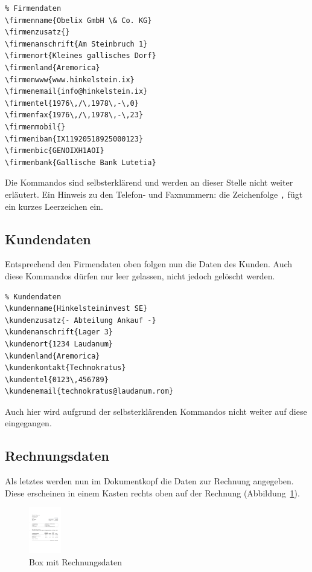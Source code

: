 \documentclass[11pt,pdftex]{scrartcl}
\newcommand{\bs}{\symbol{'134}}
\newcommand{\Cmd}[1]{\texttt{\def\{{\char`\{}\def\}{\char`\}}\bs#1}}
\begin{document}
\begin{verbatim}
% Firmendaten
\firmenname{Obelix GmbH \& Co. KG}
\firmenzusatz{}
\firmenanschrift{Am Steinbruch 1}
\firmenort{Kleines gallisches Dorf}
\firmenland{Aremorica}
\firmenwww{www.hinkelstein.ix}
\firmenemail{info@hinkelstein.ix}
\firmentel{1976\,/\,1978\,-\,0}
\firmenfax{1976\,/\,1978\,-\,23}
\firmenmobil{}
\firmeniban{IX11920518925000123}
\firmenbic{GENOIXH1AOI}
\firmenbank{Gallische Bank Lutetia}
\end{verbatim}

Die Kommandos sind selbsterklärend und werden an dieser Stelle nicht weiter erläutert. Ein Hinweis zu den Telefon- und Faxnummern: die Zeichenfolge \Cmd{,} fügt ein kurzes Leerzeichen ein.

\subsection{Kundendaten}

Entsprechend den Firmendaten oben folgen nun die Daten des Kunden. Auch diese Kommandos dürfen nur leer gelassen, nicht jedoch gelöscht werden.

\begin{verbatim}
% Kundendaten
\kundenname{Hinkelsteininvest SE}
\kundenzusatz{- Abteilung Ankauf -}
\kundenanschrift{Lager 3}
\kundenort{1234 Laudanum}
\kundenland{Aremorica}
\kundenkontakt{Technokratus}
\kundentel{0123\,456789}
\kundenemail{technokratus@laudanum.rom}
\end{verbatim}

Auch hier wird aufgrund der selbsterklärenden Kommandos nicht weiter auf diese eingegangen.

\subsection{Rechnungsdaten}

Als letztes werden nun im Dokumentkopf die Daten zur Rechnung angegeben. Diese erscheinen in einem Kasten rechts oben auf der Rechnung (Abbildung~\ref{rechtab}).

\begin{figure}[htbp]
\begin{center}
\includegraphics[height=2cm]{rechnungstabelle}

\vspace{-1em}

\caption{Box mit Rechnungsdaten}
\label{rechtab}
\end{center}
\end{figure}
\end{document}
